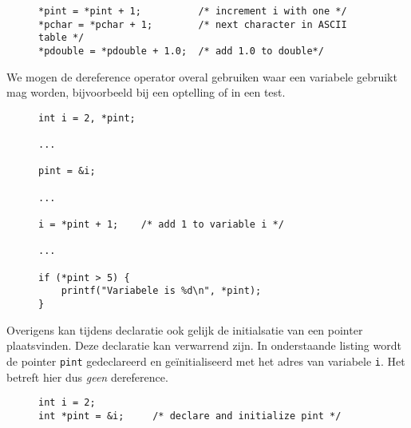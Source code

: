 \begin{figure}[!ht]
\begin{lstlisting}[caption=Gebruik van een pointer bij een toekenning.]
*pint = *pint + 1;          /* increment i with one */
*pchar = *pchar + 1;        /* next character in ASCII table */
*pdouble = *pdouble + 1.0;  /* add 1.0 to double*/
\end{lstlisting}
\end{figure}

We mogen de dereference operator overal gebruiken waar een variabele gebruikt mag worden, bijvoorbeeld bij een optelling of in een test.

\begin{figure}[!ht]
\begin{lstlisting}[caption=Gebruik van een pointer bij het afdrukken van een variabele.]
int i = 2, *pint;

...

pint = &i;

...

i = *pint + 1;    /* add 1 to variable i */

...

if (*pint > 5) {
    printf("Variabele is %d\n", *pint);
}
\end{lstlisting}
\end{figure}

Overigens kan tijdens declaratie ook gelijk de initialsatie van een pointer plaatsvinden. Deze declaratie kan verwarrend zijn. In onderstaande listing wordt de pointer \texttt{pint} gedeclareerd en geïnitialiseerd met het adres van variabele \texttt{i}. Het betreft hier dus \textsl{geen} dereference.

\begin{figure}[!ht]
\begin{lstlisting}[caption=Declaratie en initialisatie van een pointer.]
int i = 2;
int *pint = &i;     /* declare and initialize pint */
\end{lstlisting}
\end{figure}

